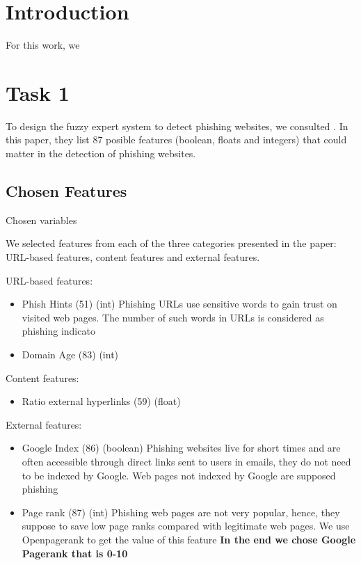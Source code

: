 \documentclass[11pt]{article}
\begin{document}
\tableofcontents
\newpage

\section{Introduction}
For this work, we 

\section{Task 1}
To design the fuzzy expert system to detect phishing websites, we consulted \cite{main_paper}. In this paper, they list 87 posible features (boolean, floats and integers) that could matter in the detection of phishing websites. 

\subsection{Chosen Features}
Chosen variables

We selected features from each of the three categories presented in the paper: URL-based features, content features and external features. 

URL-based features:
\begin{itemize}
    \item Phish Hints (51) (int)
    Phishing URLs use sensitive words to gain trust on visited web pages. The
number of such words in URLs is considered as phishing indicato
    \item Domain Age (83) (int)
\end{itemize}

Content features:
\begin{itemize}
    \item Ratio external hyperlinks (59) (float)
\end{itemize}

External features:
\begin{itemize}
    \item Google Index (86) (boolean) Phishing websites live for short times and are often accessible through direct links sent to users in emails, they do not need to be indexed by
    Google. Web pages not indexed by Google are supposed phishing
    \item Page rank (87) (int) Phishing web pages are not very popular, hence, they suppose to save low page ranks compared with legitimate web pages. We use Openpagerank to get the value of this feature \textbf{In the end we chose Google Pagerank that is 0-10}
    
\end{itemize}
\end{document}
